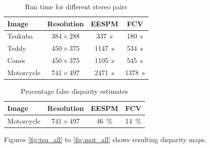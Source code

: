 \begin{table}[ht!]
  \centering
  \begin{tabular}{l c c c }
    \toprule
    Image & Resolution & EESPM & FCV \\
    \midrule
    Tsukuba & $384\times288$ & \SI{337}{\second}& \SI{180}{\second}\\
    Teddy & $450\times375$ & \SI{1147}{\second} & \SI{534}{\second} \\
    Cones & $450\times375$ & \SI{1105}{\second} & \SI{545}{\second} \\
    Motorcycle &  $741\times497$ & \SI{2471}{\second} & \SI{1378}{\second}\\
    \bottomrule
  \end{tabular}
  \caption{Run time for different stereo pairs \label{tab:runtime}}
\end{table}

\begin{table}[ht!]
  \centering
  \begin{tabular}{l c c c }
    \toprule
    Image & Resolution & EESPM & FCV \\
    \midrule
    Motorcycle & $741\times497$ & \SI{46}{\percent} & \SI{14}{\percent} \\
    \bottomrule
  \end{tabular}
  \caption{Procentage false disparity estimates \label{tab:falseesti}}
\end{table}

Figures \vref{fig:tsu_all} to \vref{fig:mot_all} shows resulting disparity maps.

